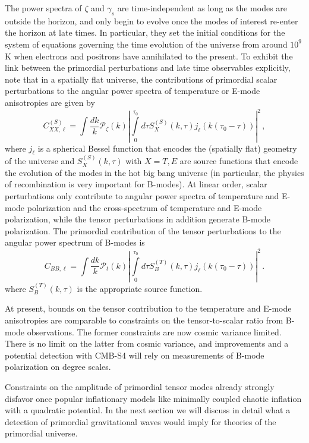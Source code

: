 The power spectra of $\zeta$ and $\gamma_s$ are time-independent as long as the modes are outside the horizon, and only begin to evolve once the modes of interest re-enter the horizon at late times. In particular, they set the initial conditions for the system of equations governing the time evolution of the universe from around $10^9$ K when electrons and positrons have annihilated to the present. To exhibit the link between the primordial perturbations and late time observables explicitly, note that in a spatially flat universe, the contributions of primordial scalar perturbations to the angular power spectra of temperature or E-mode anisotropies are given by
\begin{equation}
C^{(S)}_{XX,\ell}=\int \frac{dk}{k}\mathcal{P}_\zeta(k)\left|\int\limits_0^{\tau_0} d\tau S_X^{(S)}(k,\tau)j_\ell(k(\tau_0-\tau))\right|^2\,,
\end{equation}
where $j_\ell$ is a spherical Bessel function that encodes the (spatially flat) geometry of the universe and $S_X^{(S)}(k,\tau)$ with $X=T,E$ are source functions that encode the evolution of the modes in the hot big bang universe (in particular, the physics of recombination is very important for B-modes).
At linear order, scalar perturbations only contribute to angular power spectra of temperature and E-mode polarization and the cross-spectrum of temperature and E-mode polarization, while the tensor perturbations in addition generate B-mode polarization. The primordial contribution of the tensor perturbations to the angular power spectrum of B-modes is 
\begin{equation}
C_{BB,\ell}=\int \frac{dk}{k}\mathcal{P}_t(k)\left|\int\limits_0^{\tau_0} d\tau S_B^{(T)}(k,\tau)j_\ell(k(\tau_0-\tau))\right|^2\,.
\end{equation}
where $S_B^{(T)}(k,\tau)$ is the appropriate source function. 

At present, bounds on the tensor contribution to the temperature and E-mode anisotropies are comparable to constraints on the tensor-to-scalar ratio from B-mode observations. The former constraints are now cosmic variance limited. There is no limit on the latter from cosmic variance, and improvements and a potential detection with CMB-S4 will rely on measurements of B-mode polarization on degree scales.

Constraints on the amplitude of primordial tensor modes already strongly disfavor once popular inflationary models like minimally coupled chaotic inflation with a quadratic potential. In the next section we will discuss in detail what a detection of primordial gravitational waves would imply for theories of the primordial universe. 

